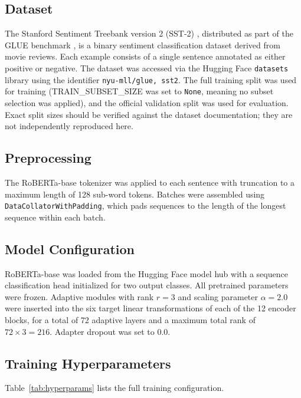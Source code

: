 \documentclass[conference]{IEEEtran}
\begin{document}
\subsection{Dataset}
The Stanford Sentiment Treebank version 2 (SST-2)
\cite{socher2013recursive}, distributed as part of the GLUE
benchmark \cite{wang2018glue}, is a binary sentiment
classification dataset derived from movie reviews. Each
example consists of a single sentence annotated as either
positive or negative. The dataset was accessed via the
Hugging Face \texttt{datasets} library using the identifier
\texttt{nyu-mll/glue, sst2}. The full training split was
used for training (TRAIN\_SUBSET\_SIZE was set to
\texttt{None}, meaning no subset selection was applied),
and the official validation split was used for evaluation.
Exact split sizes should be verified against the dataset
documentation; they are not independently reproduced here.

\subsection{Preprocessing}
The RoBERTa-base tokenizer was applied to each sentence with
truncation to a maximum length of 128 sub-word tokens.
Batches were assembled using \texttt{DataCollatorWithPadding},
which pads sequences to the length of the longest sequence
within each batch.

\subsection{Model Configuration}
RoBERTa-base \cite{liu2019roberta} was loaded from the
Hugging Face model hub with a sequence classification head
initialized for two output classes. All pretrained parameters
were frozen. Adaptive modules with rank $r = 3$ and scaling
parameter $\alpha = 2.0$ were inserted into the six target
linear transformations of each of the 12 encoder blocks, for
a total of 72 adaptive layers and a maximum total rank of
$72 \times 3 = 216$. Adapter dropout was set to 0.0.

\subsection{Training Hyperparameters}

Table~\ref{tab:hyperparams} lists the full training
configuration.
\end{document}
